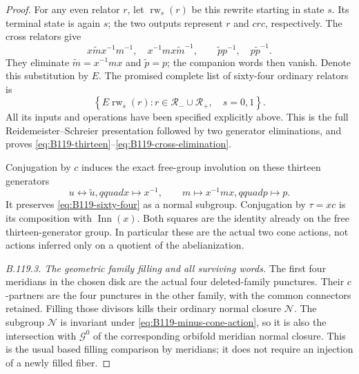 \begin{proof}
For any even relator $r$, let $\operatorname{rw}_s(r)$ be this
rewrite starting in state $s$. Its terminal state is again $s$;
the two outputs represent $r$ and $crc$, respectively. The cross
relators give
\[
 x\widetilde m x^{-1}m^{-1},\quad
 x^{-1}mx\widetilde m^{-1},\qquad
 \widetilde p p^{-1},\quad p\widetilde p^{-1}.
\]
They eliminate $\widetilde m=x^{-1}mx$ and $\widetilde p=p$;
the companion words then vanish. Denote this substitution by $E$.
The promised complete list of sixty-four ordinary relators is
\begin{equation}\label{eq:B119-sixty-four}
 \left\{E\operatorname{rw}_s(r):
       r\in\mathscr R_-\cup\mathscr R_+,\quad s=0,1\right\}.
\end{equation}
All its inputs and operations have been specified explicitly above.
This is the full Reidemeister--Schreier presentation followed by
two generator eliminations, and proves
\eqref{eq:B119-thirteen}--\eqref{eq:B119-cross-elimination}.

Conjugation by $c$ induces the exact free-group involution on these
thirteen generators
\begin{equation}\label{eq:B119-minus-cone-action}
 u\longleftrightarrow\widetilde u,qquad x\longmapsto x^{-1},
 \qquad m\longmapsto x^{-1}mx,qquad p\longmapsto p.
\end{equation}
It preserves \eqref{eq:B119-sixty-four} as a normal subgroup.
Conjugation by $\tau=xc$ is its composition with
$\operatorname{Inn}(x)$. Both squares are the identity already
on the free thirteen-generator group. In particular these are
the actual two cone actions, not actions inferred only on a quotient
of the abelianization.

\emph{B.119.3. The geometric family filling and all surviving words.}
The first four meridians in the chosen disk are the actual four
deleted-family punctures. Their $c$-partners are the four punctures
in the other family, with the common connectors retained. Filling
those divisors kills their ordinary normal closure $\mathcal N$.
The subgroup $\mathcal N$ is invariant under
\eqref{eq:B119-minus-cone-action}, so it is also the intersection
with $\mathcal G^0$ of the corresponding orbifold meridian normal
closure. This is the usual based filling comparison by meridians;
it does not require an injection of a newly filled fiber.


\end{proof}
